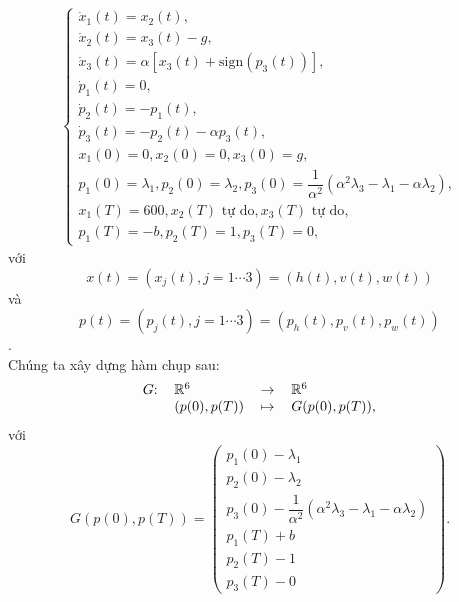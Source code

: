 \documentclass[12pt,a4paper]{report}
\begin{document}
	\begin{eqnarray}
		\begin{cases}
			\dot{x}_1(t) = x_2(t), \\ \dot{x}_2(t) = x_3(t) - g, \\ \dot{x}_3(t) = \alpha[x_3(t) + \text{sign}(p_3(t))], \\ \dot{p}_1(t) = 0, \\ \dot{p}_2(t) = -p_1(t),\\\dot{p}_3(t) = -p_2(t) - \alpha p_3(t), \\ x_1(0) = 0, x_2(0) = 0, x_3(0)=g,\\p_1(0)=\lambda_1, p_2(0)=\lambda_2,p_3(0)=\dfrac{1}{\alpha^2}(\alpha^2\lambda_3-\lambda_1-\alpha\lambda_2),\\x_1(T)=600,x_2(T)\text{ tự do}, x_3(T)\text{ tự do}, \\p_1(T)=-b, p_2(T)=1, p_3(T)=0, 
		\end{cases}
	\end{eqnarray} với $$x(t)=(x_j(t), j=1\cdots 3) = (h(t), v(t), w(t))$$ và $$p(t) = (p_j(t), j=1\cdots 3) = (p_h(t), p_v(t), p_w(t))$$. \\Chúng ta xây dựng hàm chụp sau:
\begin{eqnarray}
	\begin{tabular}{clcl}
		$G$: & $\mathbb{R}^6$ & $\to$ & $\mathbb{R}^6$ \\
		& $(p(0), p(T))$ & $\mapsto$ & $G(p(0), p(T))$, 
	\end{tabular}
\end{eqnarray} với $$G(p(0), p(T)) = \begin{pmatrix}
p_1(0)-\lambda_1 \\ p_2(0)-\lambda_2 \\ p_3(0) - \dfrac{1}{\alpha^2}(\alpha^2\lambda_3 - \lambda_1-\alpha\lambda_2)\\p_1(T)+b\\p_2(T)-1\\p_3(T)-0
\end{pmatrix}.$$
\end{document}

